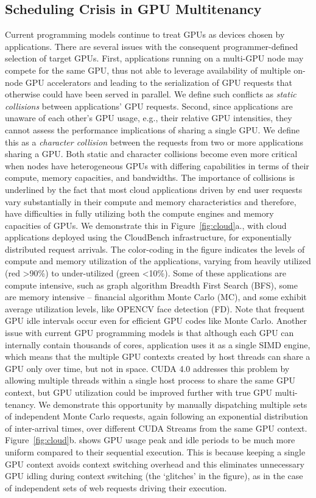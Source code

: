 \subsection{Scheduling Crisis in GPU Multitenancy}
Current programming models continue to treat GPUs as devices chosen by applications. There are several issues with the consequent programmer-defined selection of target GPUs. First, applications running on a multi-GPU node may compete for the same GPU, thus not able to leverage availability of multiple on-node GPU accelerators and leading to the serialization of GPU requests that otherwise could have been served in parallel. We define such conflicts as \textit{static collisions }between applications’ GPU requests. Second, since applications are unaware of each other’s GPU usage, e.g., their relative GPU intensities, they cannot assess the performance implications of sharing a single GPU. We define this as a \textit{character collision} between the requests from two or more applications sharing a GPU. Both static and character collisions become even more critical when nodes have heterogeneous GPUs with differing capabilities in terms of their compute, memory capacities, and bandwidths. The importance of collisions is underlined by the fact that most cloud applications driven by end user requests vary substantially in their compute and memory characteristics and therefore, have difficulties in fully utilizing both the compute engines and memory capacities of GPUs. We demonstrate this in Figure~\ref{fig:cloud}a., with cloud applications deployed using the CloudBench infrastructure, for exponentially distributed request arrivals. The color-coding in the figure indicates the levels of compute and memory utilization of the applications, varying from heavily utilized (red \textgreater   90\%) to under-utilized (green \textless   10\%). Some of these applications are compute intensive, such as graph algorithm Breadth First Search (BFS), some are memory intensive – financial algorithm Monte Carlo (MC), and some exhibit average utilization levels, like OPENCV face detection (FD). Note that frequent GPU idle intervals occur even for efficient GPU codes like Monte Carlo. Another issue with current GPU programming models is that although each GPU can internally contain thousands of cores, application uses it as a single SIMD engine, which means that the multiple GPU contexts created by host threads can share a GPU only over time, but not in space. CUDA 4.0 addresses this problem by allowing multiple threads within a single host process to share the same GPU context, but GPU utilization could be improved further with true GPU multi-tenancy. We demonstrate this opportunity by manually dispatching multiple sets of independent Monte Carlo requests, again following an exponential distribution of inter-arrival times, over different CUDA Streams from the same GPU context. Figure~\ref{fig:cloud}b. shows GPU usage peak and idle periods to be much more uniform compared to their sequential execution. This is because keeping a single GPU context avoids context switching overhead and this eliminates unnecessary GPU idling during context switching (the ‘glitches’ in the figure), as in the case of independent sets of web requests driving their execution.

